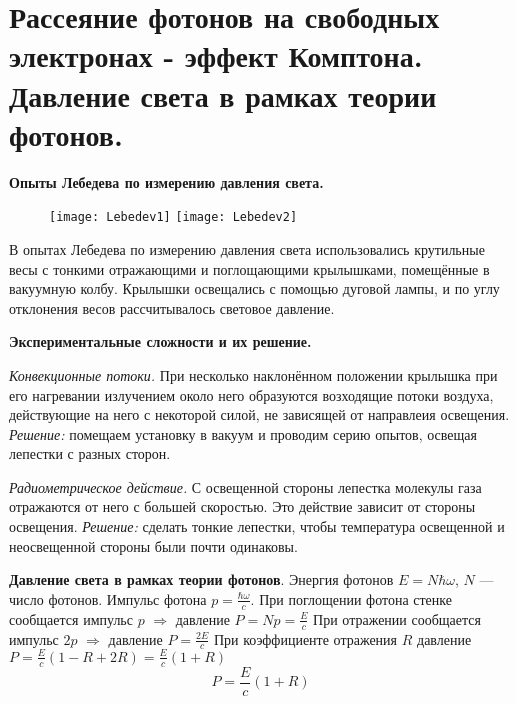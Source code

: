 \section{Рассеяние фотонов на свободных электронах - эффект Комптона. Давление света в рамках теории фотонов.}

\textbf{Опыты Лебедева по измерению давления света.}
\begin{figure}[H]
	\centering
	\texttt{[image: Lebedev1]}
	\texttt{[image: Lebedev2]}
\end{figure}
В опытах Лебедева по измерению давления света использовались крутильные весы с тонкими отражающими и поглощающими крылышками, помещённые в вакуумную колбу. Крылышки освещались с помощью дуговой лампы, и по углу отклонения весов рассчитывалось световое давление.

\textbf{Экспериментальные сложности и их решение.}

\textit{Конвекционные потоки.} При несколько наклонённом положении крылышка при его нагревании излучением около него образуются возходящие потоки воздуха, действующие на него с некоторой силой, не зависящей от направлеия освещения. \textit{Решение:} помещаем установку в вакуум и проводим серию опытов, освещая лепестки с разных сторон. 

\textit{Радиометрическое действие.} С освещенной стороны лепестка молекулы газа отражаются от него с большей скоростью. Это действие зависит от стороны освещения. \textit{Решение:} сделать тонкие лепестки, чтобы температура освещенной и неосвещенной стороны были почти одинаковы.

\textbf{Давление света в рамках теории фотонов}. \newline
Энергия фотонов $E = N\hbar\omega$, $N$ --- число фотонов. Импульс фотона $p = \frac{\hbar\omega}{c}$. \newline
При поглощении фотона стенке сообщается импульс $p$ $\Rightarrow$ давление $P = Np = \frac E{c}$ \newline
При отражении сообщается импульс $2p$ $\Rightarrow$ давление $P = \frac {2E}{c}$ \newline
При коэффициенте отражения $R$ давление $P = \frac {E}{c}(1 - R +2R)= \frac {E}{c}(1 + R)$
$$\boxed{P = \frac {E}{c}(1 + R)}$$

